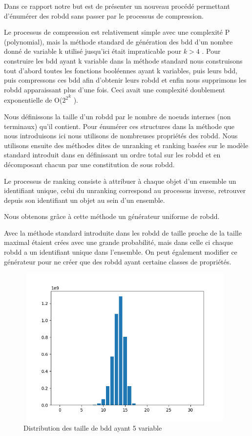 \documentclass[french]{article}
\begin{document}
Dans ce rapport notre but est de présenter un nouveau procédé permettant d'énumérer des robdd sans passer par le processus de compression.

Le processus de compression est relativement simple avec une complexité P (polynomial), mais la méthode standard de génération des bdd d'un nombre donné de variable k utilisé jusqu'ici était impraticable pour {\(k > 4\)} \cite{newton}. Pour construire les bdd ayant k variable dans la méthode standard nous construisons tout d'abord toutes les fonctions booléennes ayant k variables, puis leurs bdd, puis compressons ces bdd afin d'obtenir leurs robdd et enfin nous supprimons les robdd apparaissant plus d'une fois. Ceci avait une complexité doublement exponentielle de  O(\( {2^2}^k\) ).

Nous définissons la taille d'un robdd par le nombre de noeuds internes (non terminaux) qu'il contient.
\newpage
Pour énumérer ces structures dans la méthode que nous introduisons ici nous utilisons de nombreuses propriétés des robdd.  Nous utilisons ensuite des méthodes dites de unranking et ranking basées sur le modèle standard introduit dans \cite{wilf} en définissant un ordre total sur les robdd et en décomposant chacun par une constitution de sous robdd.

Le processus de ranking consiste à attribuer à chaque objet d'un ensemble un identifiant unique, celui du unranking correspond au processus inverse, retrouver depuis son identifiant un objet au sein d'un ensemble.

Nous obtenons grâce à cette méthode un générateur uniforme de robdd.

Avec la méthode standard introduite dans \cite{newton} les robdd de taille proche de la taille maximal étaient crées avec une grande probabilité, mais dans celle ci chaque robdd a un identifiant unique dans l'ensemble. On peut également modifier ce générateur pour ne créer que des robdd ayant certaine classes de propriétés.

\begin{figure}[htp]
    \centering
    \includegraphics[width=11cm, height=8cm]{index5}
    \caption{Distribution des taille de bdd ayant 5 variable}
    \label{fig:Figure1.2}
\end{figure}
\end{document}

